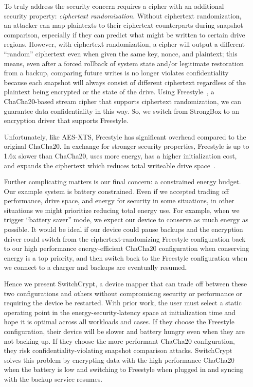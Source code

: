 To truly address the security concern requires a cipher with an additional
security property: \emph{ciphertext randomization}. Without ciphertext
randomization, an attacker can map plaintexts to their ciphertext counterparts
during snapshot comparison, especially if they can predict what might be written
to certain drive regions. However, with ciphertext randomization, a cipher will
output a different ``random'' ciphertext even when given the same key, nonce,
and plaintext; this means, even after a forced rollback of system state and/or
legitimate restoration from a backup, comparing future writes is no longer
violates confidentiality because each snapshot will always consist of different
ciphertext regardless of the plaintext being encrypted or the state of the
drive. Using Freestyle~\cite{Freestyle}, a ChaCha20-based stream cipher that
supports ciphertext randomization, we can guarantee data confidentiality in this
way. So, we switch from StrongBox to an encryption driver that supports
Freestyle.

Unfortunately, like AES-XTS, Freestyle has significant overhead compared to the
original ChaCha20. In exchange for stronger security properties, Freestyle is up
to 1.6x slower than ChaCha20, uses more energy, has a higher initialization
cost, and expands the ciphertext which reduces total writeable drive
space~\cite{Freestyle}.

Further complicating matters is our final concern: a constrained energy budget.
Our example system is battery constrained. Even if we accepted trading off
performance, drive space, and energy for security in some situations, in other
situations we might prioritize reducing total energy use. For example, when we
trigger ``battery saver'' mode, we expect our device to conserve as much energy
as possible. It would be ideal if our device could pause backups and the
encryption driver could switch from the ciphertext-randomizing Freestyle
configuration back to our high performance energy-efficient ChaCha20
configuration when conserving energy is a top priority, and then switch back to
the Freestyle configuration when we connect to a charger and backups are
eventually resumed.

Hence we present SwitchCrypt, a device mapper that can trade off between
these two configurations and others without compromising security or performance
or requiring the device be restarted. With prior work, the user must select a
static operating point in the energy-security-latency space at initialization
time and hope it is optimal across all workloads and cases. If they choose the
Freestyle configuration, their device will be slower and battery hungry even
when they are not backing up. If they choose the more performant ChaCha20
configuration, they risk confidentiality-violating snapshot comparison attacks.
SwitchCrypt solves this problem by encrypting data with the high performance
ChaCha20 when the battery is low and switching to Freestyle when plugged in and
syncing with the backup service resumes.

